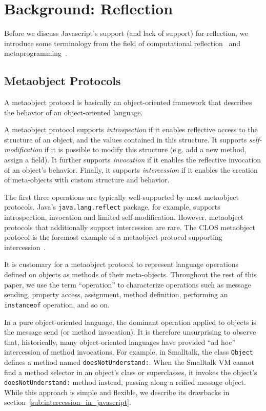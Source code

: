\documentclass{acm_proc_article-sp}
\begin{document}
\section{Background: Reflection}

Before we discuss Javascript's support (and lack of support) for reflection, we introduce some terminology from the field of computational reflection~\cite{smith84reflection,maes87concepts} and metaprogramming~\cite{kiczales91art}.

\subsection{Metaobject Protocols}
\label{sub:metaobject_protocols}

A metaobject protocol is basically an object-oriented framework that describes the behavior of an object-oriented language.

A metaobject protocol supports \emph{introspection} if it enables reflective access to the structure of an object, and the values contained in this structure. It supports \emph{self-modification} if it is possible to modify this structure (e.g. add a new method, assign a field). It further supports \emph{invocation} if it enables the reflective invocation of an object's behavior. Finally, it supports \emph{intercession} if it enables the creation of meta-objects with custom structure and behavior.

The first three operations are typically well-supported by most metaobject protocols. Java's \texttt{java.lang.reflect} package, for example, supports introspection, invocation and limited self-modification. However, metaobject protocols that additionally support intercession are rare. The CLOS metaobject protocol is the foremost example of a metaobject protocol supporting intercession~\cite{kiczales91art}.

It is customary for a metaobject protocol to represent language operations defined on objects as methods of their meta-objects. Throughout the rest of this paper, we use the term ``operation'' to characterize operations such as message sending, property access, assignment, method definition, performing an \texttt{instanceof} operation, and so on.

In a pure object-oriented language, the dominant operation applied to objects is the message send (or method invocation). It is therefore unsurprising to observe that, historically, many object-oriented languages have provided ``ad hoc'' intercession of method invocations. For example, in Smalltalk, the class \texttt{Object} defines a method named \texttt{doesNotUnderstand:}. When the Smalltalk VM cannot find a method selector in an object's class or superclasses, it invokes the object's \texttt{doesNotUnderstand:} method instead, passing along a reified message object. While this approach is simple and flexible, we describe its drawbacks in section~\ref{sub:intercession_in_javascript}.
\end{document}
